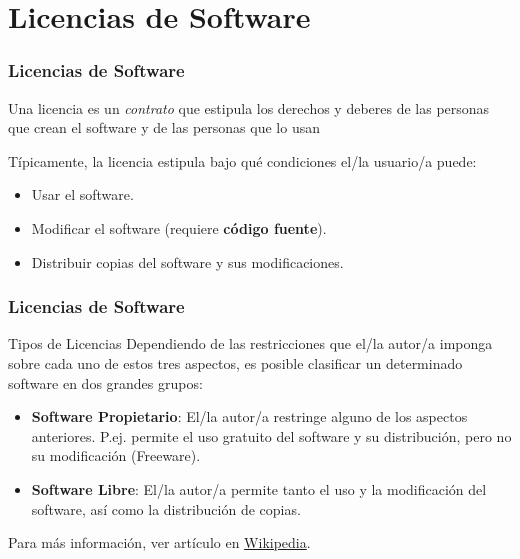\documentclass[aspectratio=169]{beamer}
\begin{document}
\section{Licencias de Software}
\begin{frame}[fragile]\frametitle{Licencias de Software}
\begin{block}{}
Una licencia es un \textit{contrato} que estipula los derechos y deberes de las personas que crean el software y de las personas que lo usan
\end{block}
\begin{block}{}
Típicamente, la licencia estipula bajo qué condiciones el/la usuario/a puede:
\begin{itemize}
\item Usar el software.
\item Modificar el software (requiere \textbf{código fuente}).
\item Distribuir copias del software y sus modificaciones.
\end{itemize}
\end{block}
\end{frame}

\begin{frame}
\frametitle{Licencias de Software}
\begin{block}{Tipos de Licencias}
Dependiendo de las restricciones que el/la autor/a imponga sobre cada uno de estos tres aspectos, es posible clasificar un determinado software en dos grandes grupos:
\begin{itemize}
\item \textbf{Software Propietario}: El/la autor/a restringe alguno de los aspectos anteriores. P.ej. permite el uso gratuito del software y su distribución, pero no su modificación (Freeware).
\item \textbf{Software Libre}: El/la autor/a permite tanto el uso y la modificación del software, así como la distribución de copias.
\end{itemize}
\end{block}
Para más información, ver artículo en \href{https://es.wikipedia.org/wiki/Licencia_de_software}{Wikipedia}.
\end{frame}
\end{document}
